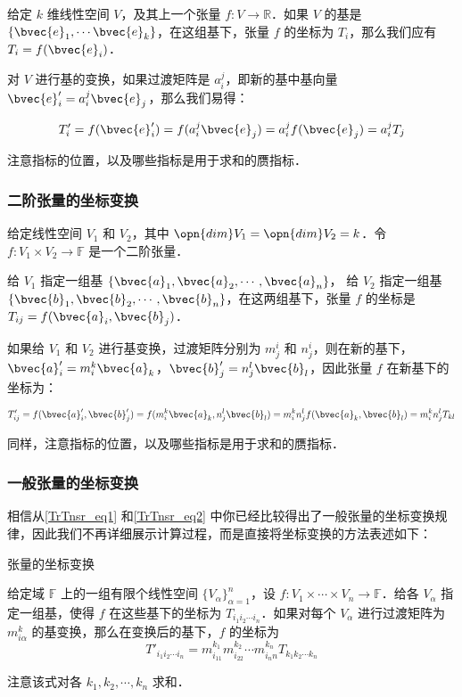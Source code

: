 给定 $k$ 维线性空间 $V$，及其上一个张量 $f:V\rightarrow\mathbb{R}$．如果 $V$ 的基是 $\{\bvec{e}_1, \cdots\bvec{e}_k\}$，在这组基下，张量 $f$ 的坐标为 $T_{i}$，那么我们应有 $T_{i}=f(\bvec{e}_i)$．

对 $V$ 进行基的变换，如果过渡矩阵是 $a_{i}^j$，即新的基中基向量 $\bvec{e}'_{i}=a_{i}^j\bvec{e}_j$，那么我们易得：

\begin{equation}\label{TrTnsr_eq1}
T'_{i}=f(\bvec{e}'_i)=f(a_{i}^j\bvec{e}_j)=a_{i}^jf(\bvec{e}_j)=a_{i}^jT_{j}
\end{equation}

注意指标的位置，以及哪些指标是用于求和的赝指标．

\subsubsection{二阶张量的坐标变换}

给定线性空间 $V_1$ 和 $V_2$，其中 $\opn{dim}V_1=\opn{dim}V_2=k$．令 $f:V_1\times V_2\rightarrow\mathbb{F}$ 是一个二阶张量．

给 $V_1$ 指定一组基 $\{\bvec{a}_1, \bvec{a}_2, \cdots, \bvec{a}_n\}$， 给 $V_2$ 指定一组基 $\{\bvec{b}_1, \bvec{b}_2, \cdots, \bvec{b}_n\}$，在这两组基下，张量 $f$ 的坐标是 $T_{ij}=f(\bvec{a}_i, \bvec{b}_j)$．

如果给 $V_1$ 和 $V_2$ 进行基变换，过渡矩阵分别为 $m^{i}_j$ 和 $n^{i}_j$，则在新的基下，$\bvec{a}'_i=m^{k}_i\bvec{a}_k$，$\bvec{b}'_j=n^{l}_j\bvec{b}_l$，因此张量 $f$ 在新基下的坐标为：

\begin{equation}\label{TrTnsr_eq2}
T'_{ij}=f(\bvec{a}'_i, \bvec{b}'_j)=f(m^{k}_i\bvec{a}_k, n^{l}_j\bvec{b}_l)=m^{k}_in^{l}_jf(\bvec{a}_k, \bvec{b}_l)=m^{k}_in^{l}_jT_{kl}
\end{equation}

同样，注意指标的位置，以及哪些指标是用于求和的赝指标．

\subsubsection{一般张量的坐标变换}

相信从\autoref{TrTnsr_eq1} 和\autoref{TrTnsr_eq2} 中你已经比较得出了一般张量的坐标变换规律，因此我们不再详细展示计算过程，而是直接将坐标变换的方法表述如下：

\begin{theorem}{张量的坐标变换}

给定域 $\mathbb{F}$ 上的一组有限个线性空间 $\{V_\alpha\}^n_{\alpha=1}$，设 $f:V_1\times\cdots\times V_n\rightarrow\mathbb{F}$．给各 $V_\alpha$ 指定一组基，使得 $f$ 在这些基下的坐标为 $T_{i_1i_2\cdots i_n}$．如果对每个 $V_\alpha$ 进行过渡矩阵为 $m^k_{i\alpha}$ 的基变换，那么在变换后的基下，$f$ 的坐标为
\begin{equation}
T'_{i_1i_2\cdots i_n}=m^{k_1}_{i_11}m^{k_2}_{i_22}\cdots m^{k_n}_{i_nn}T_{k_1k_2\cdots k_n}
\end{equation}

注意该式对各 $k_1, k_2, \cdots, k_n$ 求和．
\end{theorem}

